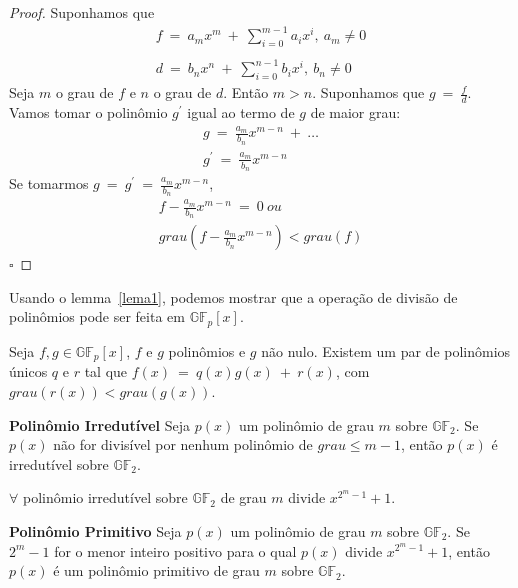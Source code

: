 \begin{proof} Suponhamos que
$$
\begin{array}{cl}
f\ =\ a_mx^m\ +\ \displaystyle\sum_{i=0}^{m-1} a_ix^i,\ a_m \neq 0\\\\
d\ =\ b_nx^n\ +\ \displaystyle\sum_{i=0}^{n-1} b_ix^i,\ b_n \neq 0
\end{array}
$$
Seja $m$ o grau de $f$ e $n$ o grau de $d$. Então $m > n$. Suponhamos que $g\ =\ \frac{f}{d}$. Vamos tomar o polinômio $g^{'}$ igual ao termo de $g$ de maior grau:
$$
\begin{array}{cl}
g\ =\ \frac{a_m}{b_n}x^{m-n}\ +\ \ldots\\
g^{'}\ =\ \frac{a_m}{b_n}x^{m-n}
\end{array}
$$
Se tomarmos $g\ =\ g^{'}\ =\ \frac{a_m}{b_n}x^{m-n}$,
$$
\begin{array}{cl}
f - \frac{a_m}{b_n}x^{m-n}\ =\ 0\ ou\\
grau(f-\frac{a_m}{b_n}x^{m-n}) < grau(f)
\end{array}
$$
$\square$
\end{proof}

Usando o lemma~\ref{lema1}, podemos mostrar que a operação de divisão de polinômios pode ser feita em $\mathbb{GF}_p[x]$.

\begin{definition} Seja $f, g \in \mathbb{GF}_p[x]$, $f$ e $g$ polinômios e $g$ não nulo. Existem um par de polinômios únicos $q$ e $r$ tal que $f(x)\ =\ q(x)g(x)\ +\ r(x)$, com $grau(r(x)) < grau(g(x))$.
\end{definition}

\begin{definition} {\bf Polinômio Irredutível} \label{PolIrred}  Seja $p(x)$ um polinômio de grau $m$ sobre $\mathbb{GF}_2$. Se $p(x)$ não for divisível por nenhum polinômio de $grau \leq m-1$, então $p(x)$ é irredutível sobre $\mathbb{GF}_2$.
\end{definition}

\begin{proposition}
$\forall$ polinômio irredutível sobre $\mathbb{GF}_2$ de grau $m$ divide $x^{2^m-1} + 1$.
\end{proposition}

\begin{definition} {\bf Polinômio Primitivo} \label{PolPrim} 
Seja $p(x)$ um polinômio de grau $m$ sobre $\mathbb{GF}_2$. Se $2^m-1$ for o menor inteiro positivo para o qual $p(x)$ divide $x^{2^m-1} + 1$, então $p(x)$ é um polinômio primitivo de grau $m$ sobre $\mathbb{GF}_2$.
\end{definition}

